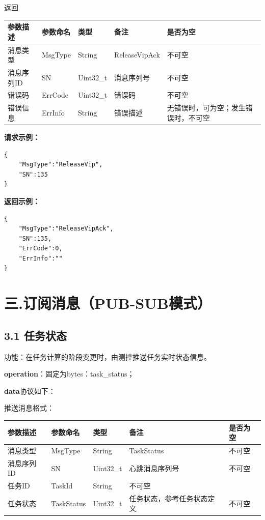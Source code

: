 \documentclass{ctexart}
\begin{document}
返回

\begin{longtable}{|l|l|l|l|l|}
\hline
\textbf{\textbf{参数描述}} & \textbf{\textbf{参数命名}} & \textbf{\textbf{类型}} & \textbf{\textbf{备注}} & \textbf{\textbf{是否为空}} \\
\hline
消息类型 & MsgType & String & ReleaseVipAck & 不可空 \\
消息序列ID & SN & Uint32_t & 消息序列号 & 不可空 \\
错误码 & ErrCode & Uint32_t & 错误码 & 不可空 \\
错误信息 & ErrInfo & String & 错误描述 & 无错误时，可为空；发生错误时，不可空 \\
\hline
\end{longtable}

\textbf{请求示例：}

\begin{verbatim}{
    "MsgType":"ReleaseVip",
    "SN":135
}\end{verbatim}
\textbf{返回示例：}
\begin{verbatim}{
    "MsgType":"ReleaseVipAck",
    "SN":135,
    "ErrCode":0,
    "ErrInfo":""
}\end{verbatim}

\section{三.订阅消息（PUB-SUB模式）}

\subsection{3.1 任务状态}

功能：在任务计算的阶段变更时，由测控推送任务实时状态信息。

\textbf{operation}：固定为bytes：task_status；

\textbf{data}协议如下：

推送消息格式：

\begin{longtable}{|l|l|l|l|l|}
\hline
\textbf{\textbf{参数描述}} & \textbf{\textbf{参数命名}} & \textbf{\textbf{类型}} & \textbf{\textbf{备注}} & \textbf{\textbf{是否为空}} \\
\hline
消息类型 & MsgType & String & TaskStatus & 不可空 \\
消息序列ID & SN & Uint32_t & 心跳消息序列号 & 不可空 \\
任务ID & TaskId & String & 不可空 \\
任务状态 & TaskStatus & Uint32_t & 任务状态，参考任务状态定义 & 不可空 \\
\hline
\end{longtable}
\end{document}

